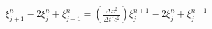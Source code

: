 \documentclass[preview]{standalone}
\begin{document}
\begin{align*}
\xi_{j+1}^{n} - 2 \xi_{j}^{n} + \xi_{j-1}^{n} =  \left(\frac{\Delta x^2}{\Delta t^2c^2}\right) \xi_{j}^{n+1} - 2 \xi_{j}^{n} + \xi_{j}^{n-1}
\end{align*}
\end{document}

